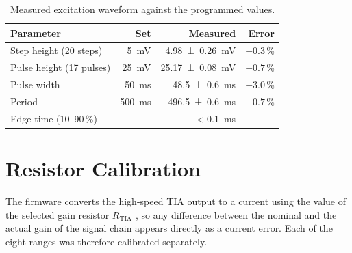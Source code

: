 \begin{table}[H]
  \centering
  \small
  \caption{Measured excitation waveform against the programmed values.}
  \label{tab:waveform}
  \begin{tabular}{@{}l r r r@{}}
    \toprule
    \textbf{Parameter} & \textbf{Set} & \textbf{Measured} & \textbf{Error} \\
    \midrule
    Step height (20 steps)   & \SI{5}{\milli\volt}     & \SI[separate-uncertainty=true]{4.98 \pm 0.26}{\milli\volt}  & $-0.3$\,\% \\
    Pulse height (17 pulses) & \SI{25}{\milli\volt}    & \SI[separate-uncertainty=true]{25.17 \pm 0.08}{\milli\volt} & $+0.7$\,\% \\
    Pulse width              & \SI{50}{\milli\second}  & \SI[separate-uncertainty=true]{48.5 \pm 0.6}{\milli\second}  & $-3.0$\,\% \\
    Period                   & \SI{500}{\milli\second} & \SI[separate-uncertainty=true]{496.5 \pm 0.6}{\milli\second} & $-0.7$\,\% \\
    Edge time (10--90\,\%)   & --                      & $<$\SI{0.1}{\milli\second}                                 & -- \\
    \bottomrule
  \end{tabular}
\end{table}

\section{Resistor Calibration}
\label{sec:rtia_cal}

The firmware converts the high-speed TIA output to a current using the value of
the selected gain resistor $R_\text{TIA}$ \cite{ad5941_ds}, so any difference
between the nominal and the actual gain of the signal chain appears directly as
a current error. Each of the eight ranges was therefore calibrated separately.

